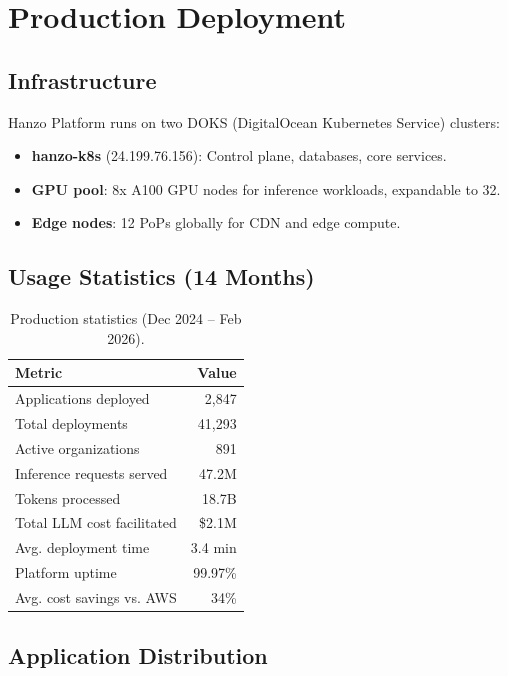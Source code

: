 \documentclass[11pt,twocolumn]{article}
\begin{document}
\section{Production Deployment}
\label{sec:production}

\subsection{Infrastructure}

Hanzo Platform runs on two DOKS (DigitalOcean Kubernetes Service) clusters:

\begin{itemize}[leftmargin=1.1em]
    \item \textbf{hanzo-k8s} (24.199.76.156): Control plane, databases, core services.
    \item \textbf{GPU pool}: 8x A100 GPU nodes for inference workloads, expandable to 32.
    \item \textbf{Edge nodes}: 12 PoPs globally for CDN and edge compute.
\end{itemize}

\subsection{Usage Statistics (14 Months)}

\begin{table}[H]
\centering
\begin{tabular}{lr}
\toprule
\textbf{Metric} & \textbf{Value} \\
\midrule
Applications deployed & 2,847 \\
Total deployments & 41,293 \\
Active organizations & 891 \\
Inference requests served & 47.2M \\
Tokens processed & 18.7B \\
Total LLM cost facilitated & \$2.1M \\
Avg. deployment time & 3.4 min \\
Platform uptime & 99.97\% \\
Avg. cost savings vs. AWS & 34\% \\
\bottomrule
\end{tabular}
\caption{Production statistics (Dec 2024 -- Feb 2026).}
\label{tab:prod_stats}
\end{table}

\subsection{Application Distribution}
\end{document}

